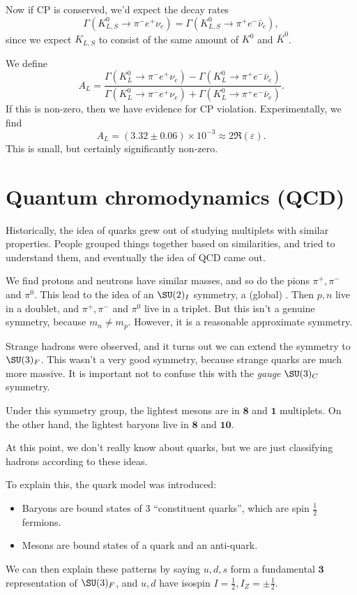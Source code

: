 \documentclass[a4paper]{article}
\begin{document}
Now if CP is conserved, we'd expect the decay rates
\[
  \Gamma(K_{L, S}^0 \to \pi^- e^+ \nu_e) = \Gamma(K_{L, S}^0 \to \pi^+ e^- \bar{\nu}_e),
\]
since we expect $K_{L, S}$ to consist of the same amount of $K^0$ and $\bar{K}^0$.

We define
\[
  A_L = \frac{\Gamma(K_L^0 \to \pi^- e^+ \nu_e) - \Gamma(K_L^0 \to \pi^+ e^- \bar{\nu}_e)}{\Gamma(K_L^0 \to \pi^- e^+ \nu_e) + \Gamma(K_L^0 \to \pi^+ e^- \bar{\nu}_e)}.
\]
If this is non-zero, then we have evidence for CP violation. Experimentally, we find
\[
  A_L = (3.32 \pm 0.06) \times 10^{-3} \approx 2 \Re (\varepsilon).
\]
This is small, but certainly significantly non-zero.


\section{Quantum chromodynamics (QCD)}
Historically, the idea of quarks grew out of studying multiplets with similar properties. People grouped things together based on similarities, and tried to understand them, and eventually the idea of QCD came out.

We find protons and neutrons have similar masses, and so do the pions $\pi^+, \pi^-$ and $\pi^0$. This lead to the idea of an $\SU(2)_I$ symmetry, a (global) . Then $p, n$ live in a doublet, and $\pi^+, \pi^-$ and $\pi^0$ live in a triplet. But this isn't a genuine symmetry, because $m_n \not= m_p$. However, it is a reasonable approximate symmetry.

Strange hadrons were observed, and it turns out we can extend the symmetry to $\SU(3)_F$. This wasn't a very good symmetry, because strange quarks are much more massive. It is important not to confuse this with the \emph{gauge} $\SU(3)_C$ symmetry.

Under this symmetry group, the lightest mesons are in $\mathbf{8}$ and $\mathbf{1}$ multiplets. On the other hand, the lightest baryons live in $\mathbf{8}$ and $\mathbf{10}$.

At this point, we don't really know about quarks, but we are just classifying hadrons according to these ideas.

To explain this, the quark model was introduced:
\begin{itemize}
  \item Baryons are bound states of $3$ ``constituent quarks'', which are spin $\frac{1}{2}$ fermions.
  \item Mesons are bound states of a quark and an anti-quark.
\end{itemize}
We can then explain these patterns by saying $u, d, s$ form a fundamental $\mathbf{3}$ representation of $\SU(3)_F$, and $u, d$ have isospin $I = \frac{1}{2}, I_Z = \pm \frac{1}{2}$.
\end{document}
